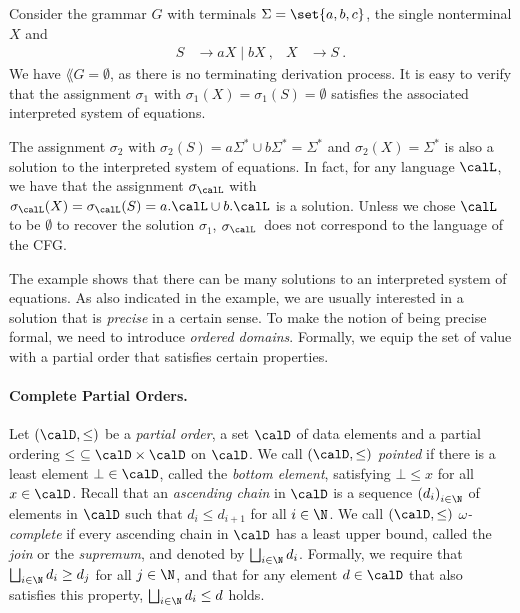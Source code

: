 \documentclass[../../diss.tex]{subfiles}
\begin{document}
\begin{example}%
\label{Example:EDSSysOfEqCFG}%
    Consider the grammar $G$ with terminals $\Sigma = \set{a ,b, c}$, the single nonterminal $X$ and 
    \begin{align*}
        S &\to aX \mid bX
        \ ,
        &
        X &\to S
        \ .
    \end{align*}
    We have $\lang{G} = \emptyset$, as there is no terminating derivation process.
    It is easy to verify that the assignment $\sigma_1$ with $\sigma_1(X) = \sigma_1(S) = \emptyset$ satisfies the associated interpreted system of equations.

    The assignment $\sigma_2$ with $\sigma_2(S) = a\Sigma^* \cup b\Sigma^* = \Sigma^*$ and $\sigma_2(X) = \Sigma^*$ is also a solution to the interpreted system of equations.
    In fact, for any language $\calL$, we have that the assignment $\sigma_{\calL}$ with $\sigma_{\calL}(X) = \sigma_{\calL}(S) = a.\calL \cup b.\calL$ is a solution.
    Unless we chose $\calL$ to be $\emptyset$ to recover the solution $\sigma_1$, $\sigma_{\calL}$~does not correspond to the language of the CFG.\@
\end{example}

The example shows that there can be many solutions to an interpreted system of equations.
As also indicated in the example, we are usually interested in a solution that is \emph{precise} in a certain sense.
To make the notion of being precise formal, we need to introduce \emph{ordered domains}.
Formally, we equip the set of value with a partial order that satisfies certain properties.

\paragraph{Complete Partial Orders.}


Let $(\domain, \leq)$ be a \emph{partial order}, \ie a set $\domain$ of data elements and a partial ordering $\leq \ \subseteq \domain \times \domain$ on $\domain$.
We call $(\domain, \leq)$ \emph{pointed} if there is a least element $\bot \in \domain$, called the \emph{bottom element}, satisfying $\bot \leq x$ for all $x \in \domain$.
%
Recall that an \emph{ascending chain} in $\domain$ is a sequence ${(d_i)}_{i \in \N}$ of elements in $\domain$ such that $d_i \leq d_{i+1}$ for all $i \in \N$.
We call $(\domain, \leq)$ \emph{$\omega$-complete} if every ascending chain in $\domain$ has a least upper bound, called the \emph{join} or the \emph{supremum}, and denoted by $\bigsqcup_{i \in  \N} d_i$.
Formally, we require that $\bigsqcup_{i \in  \N} d_i \geq d_j$ for all $j \in  \N$, and that for any element $d \in \domain$ that also satisfies this property, $\bigsqcup_{i \in  \N} d_i \leq d$ holds.
\end{document}
